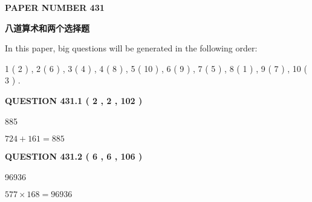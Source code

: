 \documentclass{ctexart}
\begin{document}
   
   
   
\newpage 
\setcounter{page}{ 
   431001 } 
   
   
   
   
 {\textbf{ \Large{ PAPER NUMBER  431  }}}
   
   
\vspace{0.2in}
   
   
   
   
   
   
 \vspace{0.2in}
{\LARGE {\textbf{ 八道算术和两个选择题}}}
   
   
   
\vspace{0.2in}
   
In this paper, big questions will be generated in the following order: 
   
   
   1 ( 2 )
 ,
   2 ( 6 )
 ,
   3 ( 4 )
 ,
   4 ( 8 )
 ,
   5 ( 10 )
 ,
   6 ( 9 )
 ,
   7 ( 5 )
 ,
   8 ( 1 )
 ,
   9 ( 7 )
 ,
   10 ( 3 )
 .
  
\vspace{0.2in}
  
{\textbf{\Large{QUESTION
431.1 
 ( 2 , 2 , 102 )
}}}
  
  
 
 
\noindent{}

885
 
 
 
 
\noindent{}

$ %
724 +  %
161=   %
885$
 
 
  
\vspace{0.2in}
  
{\textbf{\Large{QUESTION
431.2 
 ( 6 , 6 , 106 )
}}}
  
  
 
 
\noindent{}

96936
 
 
 
 
\noindent{}

$ %
577 \times  %
168=   %
96936$
 
\end{document}
